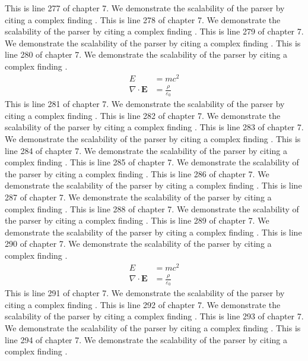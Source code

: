 This is line 277 of chapter 7. We demonstrate the scalability of the parser by citing a complex finding \cite{ref7_277}.
This is line 278 of chapter 7. We demonstrate the scalability of the parser by citing a complex finding \cite{ref7_278}.
This is line 279 of chapter 7. We demonstrate the scalability of the parser by citing a complex finding \cite{ref7_279}.
This is line 280 of chapter 7. We demonstrate the scalability of the parser by citing a complex finding \cite{ref7_280}.
\begin{align*}
  E &= mc^2 \\
  \nabla \cdot \mathbf{E} &= \frac{\rho}{\varepsilon_0}
\end{align*}
This is line 281 of chapter 7. We demonstrate the scalability of the parser by citing a complex finding \cite{ref7_281}.
This is line 282 of chapter 7. We demonstrate the scalability of the parser by citing a complex finding \cite{ref7_282}.
This is line 283 of chapter 7. We demonstrate the scalability of the parser by citing a complex finding \cite{ref7_283}.
This is line 284 of chapter 7. We demonstrate the scalability of the parser by citing a complex finding \cite{ref7_284}.
This is line 285 of chapter 7. We demonstrate the scalability of the parser by citing a complex finding \cite{ref7_285}.
This is line 286 of chapter 7. We demonstrate the scalability of the parser by citing a complex finding \cite{ref7_286}.
This is line 287 of chapter 7. We demonstrate the scalability of the parser by citing a complex finding \cite{ref7_287}.
This is line 288 of chapter 7. We demonstrate the scalability of the parser by citing a complex finding \cite{ref7_288}.
This is line 289 of chapter 7. We demonstrate the scalability of the parser by citing a complex finding \cite{ref7_289}.
This is line 290 of chapter 7. We demonstrate the scalability of the parser by citing a complex finding \cite{ref7_290}.
\begin{align*}
  E &= mc^2 \\
  \nabla \cdot \mathbf{E} &= \frac{\rho}{\varepsilon_0}
\end{align*}
This is line 291 of chapter 7. We demonstrate the scalability of the parser by citing a complex finding \cite{ref7_291}.
This is line 292 of chapter 7. We demonstrate the scalability of the parser by citing a complex finding \cite{ref7_292}.
This is line 293 of chapter 7. We demonstrate the scalability of the parser by citing a complex finding \cite{ref7_293}.
This is line 294 of chapter 7. We demonstrate the scalability of the parser by citing a complex finding \cite{ref7_294}.
